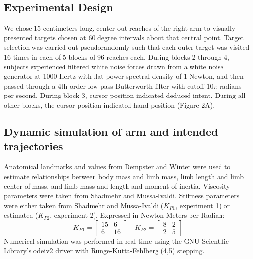\documentclass[letterpaper, 10 pt, conference]{ieeeconf}  %
\begin{document}
\subsection*{Experimental Design}
We chose 15 centimeters long, center-out reaches of the right arm to visually-presented targets chosen at 60 degree intervals about that central point. Target selection was carried out pseudorandomly such that each outer target was visited 16 times in each of 5 blocks of 96 reaches each. During blocks 2 through 4, subjects experienced filtered white noise forces drawn from a white noise generator at 1000 Hertz with flat power spectral density of 1 Newton, and then passed through a 4th order low-pass Butterworth filter with cutoff $10 \pi$ radians per second. During block 3, cursor position indicated deduced intent. During all other blocks, the cursor position indicated hand position (Figure 2A).

\subsection*{Dynamic simulation of arm and intended trajectories}
Anatomical landmarks and values from Dempster \cite{dempster1955space} and Winter \cite{winter2009biomechanics} were used to estimate relationships between body mass and limb mass, limb length and limb center of mass, and limb mass and length and moment of inertia. Viscosity parameters were taken from Shadmehr and Mussa-Ivaldi\cite{shadmehr1994adaptive}. Stiffness parameters were either taken from Shadmehr and Mussa-Ivaldi\cite{shadmehr1994adaptive} ($K_{P1}$, experiment 1) or estimated ($K_{P2}$, experiment 2). Expressed in Newton-Meters per Radian:
\begin{equation}
K_{P1}=
\begin{bmatrix}
15 & 6 \\
6 & 16
\end{bmatrix}
\quad
K_{P2}=
\begin{bmatrix}
8 & 2 \\
2 & 5
\end{bmatrix}
\end{equation}
Numerical simulation was performed in real time using the GNU Scientific Library's odeiv2 driver with Runge-Kutta-Fehlberg (4,5) stepping\cite{gough2009gnu}.
\end{document}
